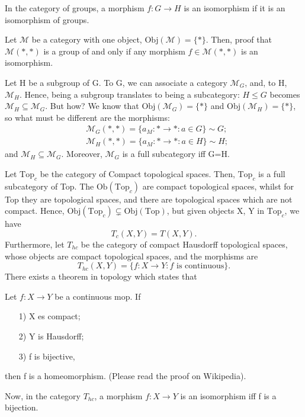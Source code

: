 \documentclass[../category_theory.tex]{subfiles}
\begin{document}
\begin{example}
	In the category of groups, a morphism \(f:G\rightarrow H\) is an isomorphism if it is an isomorphism of groups.
\end{example}
\begin{exr}
	Let \(\mathcal{M}\) be a category with one object, \(\mathrm{Obj}(\mathcal{M})=\{*\}.\) Then, proof that \(\mathcal{M}(*, *)\) is a group of and only if any morphism \(f\in \mathcal{M}(*, *)\) is an isomorphism.
\end{exr}
\begin{example}
	Let H be a subgroup of G. To G, we can associate a category \(\mathcal{M}_{G}\), and, to H, \(\mathcal{M}_{H}\). Hence, being a subgroup translates to being a subcategory: \(H\leq G \) becomes \(\mathcal{M}_{H}\subseteq \mathcal{M}_{G}\). But how? We know that \(\mathrm{Obj}(\mathcal{M}_{G})=\{*\}\) and \(\mathrm{Obj}(\mathcal{M}_{H})=\{*\}\), so what must be different are the morphisms:
	\begin{align*}
		 & \mathcal{M}_{G}(*, *)=\{a_{M}:*\rightarrow *: a\in G\}\sim G; \\
		 & \mathcal{M}_{H}(*, *)=\{a_{M}:*\rightarrow *: a\in H\}\sim H;
	\end{align*}
	and \(\mathcal{M}_{H}\subseteq \mathcal{M}_{G}\). Moreover, \(\mathcal{M}_{G}\) is a full subcategory iff G=H.
\end{example}
\begin{example}
	Let \(\text{Top}_{c}\) be the category of Compact topological spaces. Then, \(\text{Top}_{c}\) is a full subcategory of Top. The \(\mathrm{Ob}(\text{Top}_{c})\) are compact topological spaces, whilst for Top they are topological spaces, and there are topological spaces which are not compact. Hence, \(\mathrm{Obj}(\text{Top}_{c})\subsetneq \mathrm{Obj}(\text{Top}) \), but given objects X, Y in \(\text{Top}_{c}\), we have
	\[
		T_{c}(X, Y)=T(X, Y).
	\]
	Furthermore, let \(T_{hc}\) be the category of compact Hausdorff topological spaces, whose objects are compact topological spaces, and the morphisms are
	\[
		T_{hc}(X, Y)=\{f:X\rightarrow Y: f \text{ is continuous}\}.
	\]
	There exists a theorem in topology which states that
	\begin{theorem*}
		Let \(f:X\rightarrow Y\) be a continuous mop. If
		\begin{itemize}
			\item[1)] X es compact;
			\item[2)] Y is Hausdorff;
			\item[3)] f is bijective,
		\end{itemize}
		then f is a homeomorphism. (Please read the proof on Wikipedia).
	\end{theorem*}
	Now, in the category \(T_{hc}\), a morphism \(f:X\rightarrow Y\) is an isomorphism iff f is a bijection.
\end{example}
\end{document}
